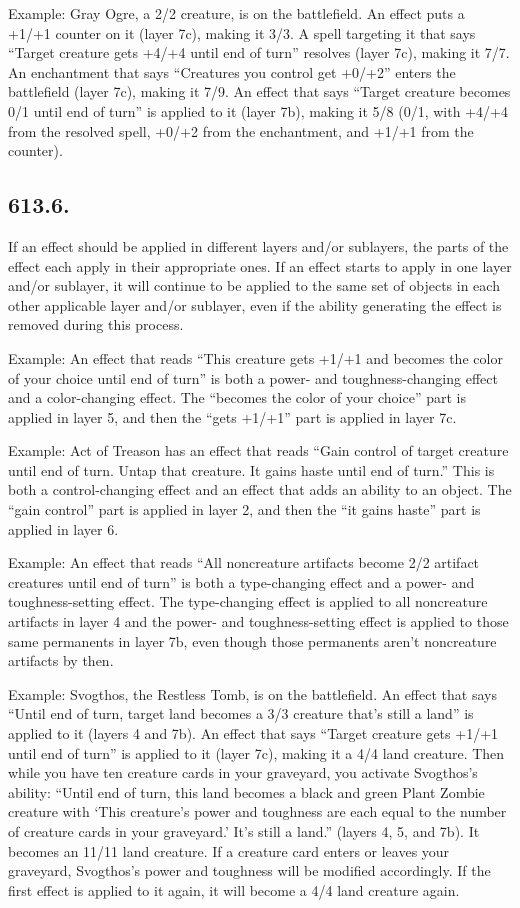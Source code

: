 Example: Gray Ogre, a 2/2 creature, is on the battlefield. An effect puts a +1/+1 counter on it (layer 7c), making it 3/3. A spell targeting it that says “Target creature gets +4/+4 until end of turn” resolves (layer 7c), making it 7/7. An enchantment that says “Creatures you control get +0/+2” enters the battlefield (layer 7c), making it 7/9. An effect that says “Target creature becomes 0/1 until end of turn” is applied to it (layer 7b), making it 5/8 (0/1, with +4/+4 from the resolved spell, +0/+2 from the enchantment, and +1/+1 from the counter).

\subsection*{613.6.}
If an effect should be applied in different layers and/or sublayers, the parts of the effect each apply in their appropriate ones. If an effect starts to apply in one layer and/or sublayer, it will continue to be applied to the same set of objects in each other applicable layer and/or sublayer, even if the ability generating the effect is removed during this process.

Example: An effect that reads “This creature gets +1/+1 and becomes the color of your choice until end of turn” is both a power- and toughness-changing effect and a color-changing effect. The “becomes the color of your choice” part is applied in layer 5, and then the “gets +1/+1” part is applied in layer 7c.

Example: Act of Treason has an effect that reads “Gain control of target creature until end of turn. Untap that creature. It gains haste until end of turn.” This is both a control-changing effect and an effect that adds an ability to an object. The “gain control” part is applied in layer 2, and then the “it gains haste” part is applied in layer 6.

Example: An effect that reads “All noncreature artifacts become 2/2 artifact creatures until end of turn” is both a type-changing effect and a power- and toughness-setting effect. The type-changing effect is applied to all noncreature artifacts in layer 4 and the power- and toughness-setting effect is applied to those same permanents in layer 7b, even though those permanents aren’t noncreature artifacts by then.

Example: Svogthos, the Restless Tomb, is on the battlefield. An effect that says “Until end of turn, target land becomes a 3/3 creature that’s still a land” is applied to it (layers 4 and 7b). An effect that says “Target creature gets +1/+1 until end of turn” is applied to it (layer 7c), making it a 4/4 land creature. Then while you have ten creature cards in your graveyard, you activate Svogthos’s ability: “Until end of turn, this land becomes a black and green Plant Zombie creature with ‘This creature’s power and toughness are each equal to the number of creature cards in your graveyard.’ It’s still a land.” (layers 4, 5, and 7b). It becomes an 11/11 land creature. If a creature card enters or leaves your graveyard, Svogthos’s power and toughness will be modified accordingly. If the first effect is applied to it again, it will become a 4/4 land creature again.

